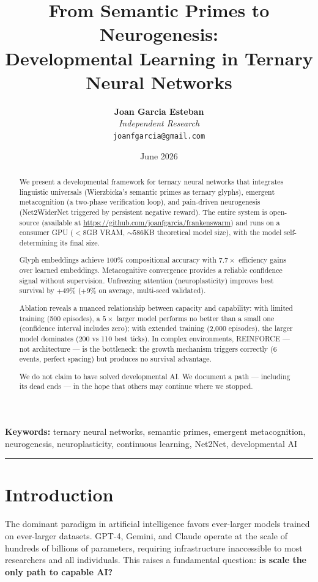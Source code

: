 \documentclass{article}
\title{\textbf{From Semantic Primes to Neurogenesis:\\Developmental Learning in Ternary Neural Networks}}
\author{\textbf{Joan Garcia Esteban} \\ \textit{Independent Research} \\ \texttt{joanfgarcia@gmail.com}}
\date{June 2026}
\begin{document}
\maketitle

\begin{abstract}
We present a developmental framework for ternary neural networks that integrates linguistic universals (Wierzbicka's semantic primes as ternary glyphs), emergent metacognition (a two-phase verification loop), and pain-driven neurogenesis (Net2WiderNet triggered by persistent negative reward). The entire system is open-source (available at \url{https://github.com/joanfgarcia/frankenswarm}) and runs on a consumer GPU ($<8$GB VRAM, $\sim 586$KB theoretical model size), with the model self-determining its final size.

Glyph embeddings achieve 100\% compositional accuracy with $7.7\times$ efficiency gains over learned embeddings. Metacognitive convergence provides a reliable confidence signal without supervision. Unfreezing attention (neuroplasticity) improves best survival by $+49\%$ ($+9\%$ on average, multi-seed validated).

Ablation reveals a nuanced relationship between capacity and capability: with limited training (500 episodes), a $5\times$ larger model performs no better than a small one (confidence interval includes zero); with extended training (2,000 episodes), the larger model dominates (200 vs 110 best ticks). In complex environments, REINFORCE --- not architecture --- is the bottleneck: the growth mechanism triggers correctly (6 events, perfect spacing) but produces no survival advantage.

We do not claim to have solved developmental AI. We document a path --- including its dead ends --- in the hope that others may continue where we stopped.
\end{abstract}

\textbf{Keywords:} ternary neural networks, semantic primes, emergent metacognition, neurogenesis, neuroplasticity, continuous learning, Net2Net, developmental AI

\hrule

\section{Introduction}

The dominant paradigm in artificial intelligence favors ever-larger models trained on ever-larger datasets. GPT-4, Gemini, and Claude operate at the scale of hundreds of billions of parameters, requiring infrastructure inaccessible to most researchers and all individuals. This raises a fundamental question: \textbf{is scale the only path to capable AI?}
\end{document}
